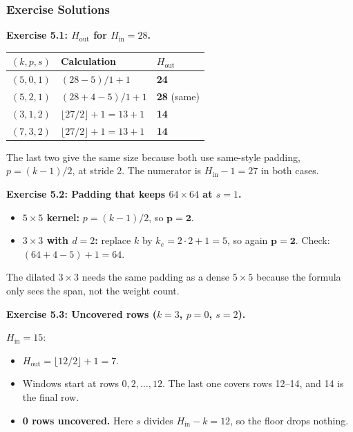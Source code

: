 \subsubsection*{Exercise Solutions}

\textbf{Exercise 5.1: $H_{\text{out}}$ for $H_{\text{in}}=28$.}

\begin{center}
\begin{tabular}{lll}
\toprule
$(k,p,s)$ & Calculation & $H_{\text{out}}$\\
\midrule
$(5,0,1)$ & $(28-5)/1+1$ & \textbf{24}\\
$(5,2,1)$ & $(28+4-5)/1+1$ & \textbf{28} (same)\\
$(3,1,2)$ & $\lfloor27/2\rfloor+1=13+1$ & \textbf{14}\\
$(7,3,2)$ & $\lfloor27/2\rfloor+1=13+1$ & \textbf{14}\\
\bottomrule
\end{tabular}
\end{center}

The last two give the same size because both use same-style padding, $p=(k-1)/2$, at stride 2. The numerator is $H_{\text{in}}-1=27$ in both cases.

\textbf{Exercise 5.2: Padding that keeps $64\times64$ at $s=1$.}
\begin{itemize}
  \item \textbf{$5\times5$ kernel:} $p=(k-1)/2$, so $\mathbf{p=2}$.
  \item \textbf{$3\times3$ with $d=2$:} replace $k$ by $k_e=2\cdot2+1=5$, so again $\mathbf{p=2}$. Check: $(64+4-5)+1=64$.
\end{itemize}
The dilated $3\times3$ needs the same padding as a dense $5\times5$ because the formula only sees the span, not the weight count.

\textbf{Exercise 5.3: Uncovered rows ($k=3$, $p=0$, $s=2$).}

$H_{\text{in}}=15$:
\begin{itemize}
  \item $H_{\text{out}}=\lfloor12/2\rfloor+1=7$.
  \item Windows start at rows $0,2,\dots,12$. The last one covers rows 12--14, and 14 is the final row.
  \item \textbf{0 rows uncovered.} Here $s$ divides $H_{\text{in}}-k=12$, so the floor drops nothing.
\end{itemize}

